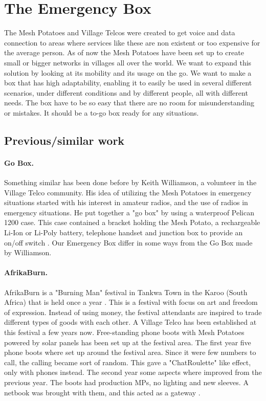 \section{The Emergency Box}
The Mesh Potatoes and Village Telcos were created to get voice and data connection to areas where services like these are non existent or too expensive for the average person. As of now the Mesh Potatoes have been set up to create small or bigger networks in villages all over the world. We want to expand this solution by looking at its mobility and its usage on the go. We want to make a box that has high adaptability, enabling it to easily be used in several different scenarios, under different conditions and by different people, all with different needs. The box have to be so easy that there are no room for misunderstanding or mistakes. It should be a to-go box ready for any situations.  
 
\subsection{Previous/similar work}
\paragraph{Go Box.} Something similar has been done before by Keith Williamson, a volunteer in the Village Telco community. His idea of utilizing the Mesh Potatoes in emergency situations started with his interest in amateur radios, and the use of radios in emergency situations. He put together a "go box" by using a waterproof Pelican 1200 case. This case contained a bracket holding the Mesh Potato, a rechargeable Li-Ion or Li-Poly battery, telephone handset and junction box to provide an on/off switch \cite{keith}. Our Emergency Box differ in some ways from the Go Box made by Williamson. 

\paragraph{AfrikaBurn.}
AfrikaBurn is a "Burning Man" festival in Tankwa Town in the Karoo (South Africa) that is held once a year \cite{whatisafrikaburn}. This is a festival with focus on art and freedom of expression. Instead of using money, the festival attendants are inspired to trade different types of goods with each other. A Village Telco has been established at this festival a few years now. Free-standing phone boots with Mesh Potatoes powered by solar panels has been set up at the festival area. The first year five phone boots where set up around the festival area. Since it were few numbers to call, the calling became sort of random. This gave a  "ChatRoulette" like effect, only with phones instead. The second year some aspects where improved from the previous year. The boots had production MPs, no lighting and new sleeves. A netbook was brought with them, and this acted as a gateway \cite{africaburnforavillagetelco,africaburnsagainforavillagetelco}. 

